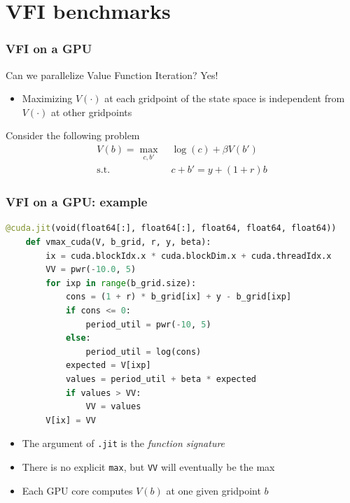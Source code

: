 \documentclass[10pt, aspectratio=1610]{beamer}
\begin{document}
\section{VFI benchmarks}

\begin{frame}
  \frametitle{VFI on a GPU}

  Can we parallelize Value Function Iteration?
  \alert{Yes!}

  \begin{itemize}
    \item Maximizing $V(\cdot)$ at each gridpoint of the state space is independent from $V(\cdot)$ at other gridpoints
  \end{itemize}

  \vfill

  Consider the following problem
  \begin{align*}
    V(b) = \max_{c, b'} &\; \log(c) + \beta V(b') \\
    \text{s.t.} &\; c + b' = y + (1+r) b
  \end{align*}

\end{frame}

\begin{frame}[fragile]
  \frametitle{VFI on a GPU: example}

  \begin{lstlisting}[language=python]
    @cuda.jit(void(float64[:], float64[:], float64, float64, float64))
    def vmax_cuda(V, b_grid, r, y, beta):
        ix = cuda.blockIdx.x * cuda.blockDim.x + cuda.threadIdx.x
        VV = pwr(-10.0, 5)
        for ixp in range(b_grid.size):
            cons = (1 + r) * b_grid[ix] + y - b_grid[ixp]
            if cons <= 0:
                period_util = pwr(-10, 5)
            else:
                period_util = log(cons)
            expected = V[ixp]
            values = period_util + beta * expected
            if values > VV:
                VV = values
        V[ix] = VV
  \end{lstlisting}

  \begin{itemize}
    \item The argument of \texttt{\@cuda.jit} is the \emph{function signature}
    \item There is no explicit \texttt{max}, but \texttt{VV} will eventually be the max
    \item Each GPU core computes $V(b)$ at one given gridpoint $b$
  \end{itemize}

\end{frame}
\end{document}
